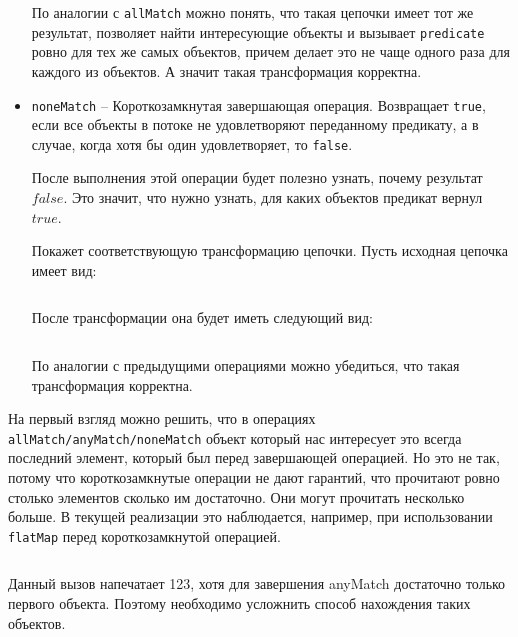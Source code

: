\begin{itemize}
	По аналогии с \texttt{allMatch} можно понять, что такая цепочки имеет тот же результат, позволяет найти интересующие объекты и вызывает \texttt{predicate} ровно для тех же самых объектов, причем делает это не чаще одного раза для каждого из объектов. А значит такая трансформация корректна.
	\item \texttt{noneMatch} -- Короткозамкнутая завершающая операция. Возвращает \texttt{true}, если все объекты в потоке не удовлетворяют переданному предикату, а в случае, когда хотя бы один удовлетворяет, то \texttt{false}.
	
	После выполнения этой операции будет полезно узнать, почему результат $false$. Это значит, что нужно узнать, для каких объектов предикат вернул $true$. 
	
	Покажет соответствующую трансформацию цепочки. Пусть исходная цепочка имеет вид:
	\inputminted{java}{chapter2/code/anyMatch.java}
	
	После трансформации она будет иметь следующий вид:
	
	\inputminted{java}{chapter2/code/anyMatchTransform.java}
	
	По аналогии с предыдущими операциями можно убедиться, что такая трансформация корректна.
\end{itemize}

На первый взгляд можно решить, что в операциях \texttt{allMatch/anyMatch/noneMatch} объект который нас интересует это всегда последний элемент, который был перед завершающей операцией. Но это не так, потому что короткозамкнутые операции не дают гарантий, что прочитают ровно столько элементов сколько им достаточно. Они могут прочитать несколько больше. В текущей реализации это наблюдается, например, при использовании \texttt{flatMap} перед короткозамкнутой операцией. 
\inputminted{java}{chapter2/code/flatMapBeforeAnyMatch.java}
Данный вызов напечатает 123, хотя для завершения anyMatch достаточно только первого объекта. Поэтому необходимо усложнить способ нахождения таких объектов.

